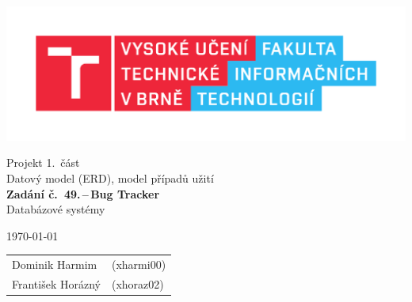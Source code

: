 \documentclass[11pt, a4paper]{article}
\begin{document}
	\begin{titlepage}
		\begin{center}
			\includegraphics[width=0.77 \linewidth]{FIT_logo.pdf} \\


			\Huge{Projekt 1.~část} \\
			\Huge{Datový model (ERD), model případů užití} \\
			\LARGE{\textbf{Zadání č.~49.\,--\,Bug Tracker}} \\
			\Large{Databázové systémy}

		\end{center}

		{\Large
			\today
			\hfill
			\begin{tabular}{l l}
				Dominik Harmim & (xharmi00) \\
				František Horázný & (xhoraz02) \\
			\end{tabular}
		}
	\end{titlepage}
\end{document}
